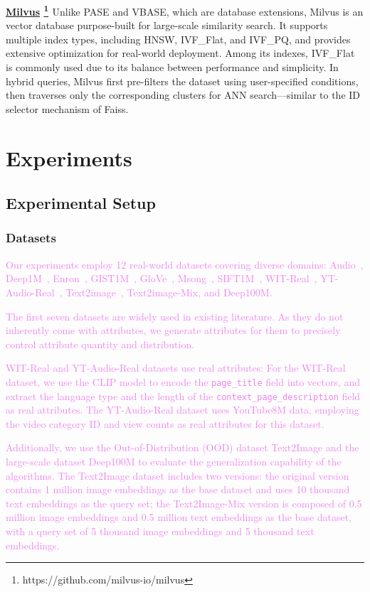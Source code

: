 \documentclass[sigconf, nonacm]{acmart}
\begin{document}
	\noindent\textbf{\underline{Milvus} \footnote{https://github.com/milvus-io/milvus} \cite{milvus}}
	Unlike PASE and VBASE, which are database extensions, Milvus is an vector database purpose-built for large-scale similarity search. It supports multiple index types, including HNSW, IVF\_Flat, and IVF\_PQ, and provides extensive optimization for real-world deployment. Among its indexes, IVF\_Flat is commonly used due to its balance between performance and simplicity. In hybrid queries, Milvus first pre-filters the dataset using user-specified conditions, then traverses only the corresponding clusters for ANN search—similar to the ID selector mechanism of Faiss.
	
	\section{Experiments}
	\subsection{Experimental Setup}
	\subsubsection{Datasets}
	
	\textcolor{violet}{Our experiments employ 12 real-world datasets covering diverse domains: Audio~\cite{audio_unknown}, Deep1M~\cite{yandex_deep_dataset}, Enron~\cite{enron2015}, GIST1M~\cite{sift2010}, GloVe~\cite{GloVe2015}, Msong~\cite{msong2011}, SIFT1M~\cite{sift2010}, WIT-Real~\cite{wit_dataset}, YT-Audio-Real~\cite{youtube8m_dataset}, Text2image~\cite{texttoimage}, Text2image-Mix, and Deep100M.}
	
	\textcolor{violet}{The first seven datasets are widely used in existing literature. As they do not inherently come with attributes, we generate attributes for them to precisely control attribute quantity and distribution.}
	
	\textcolor{violet}{WIT-Real and YT-Audio-Real datasets use real attributes: For the WIT-Real dataset, we use the CLIP model to encode the \texttt{page\_title} field into vectors, and extract the language type and the length of the \texttt{context\_page\_description} field as real attributes. The YT-Audio-Real dataset uses YouTube8M data, employing the video category ID and view counts as real attributes for this dataset.}
	
	\textcolor{violet}{Additionally, we use the Out-of-Distribution (OOD) dataset Text2Image and the large-scale dataset Deep100M to evaluate the generalization capability of the algorithms. The Text2Image dataset includes two versions: the original version contains 1 million image embeddings as the base dataset and uses 10 thousand text embeddings as the query set; the Text2Image-Mix version is composed of 0.5 million image embeddings and 0.5 million text embeddings as the base dataset, with a query set of 5 thousand image embeddings and 5 thousand text embeddings.}
	
\end{document}
